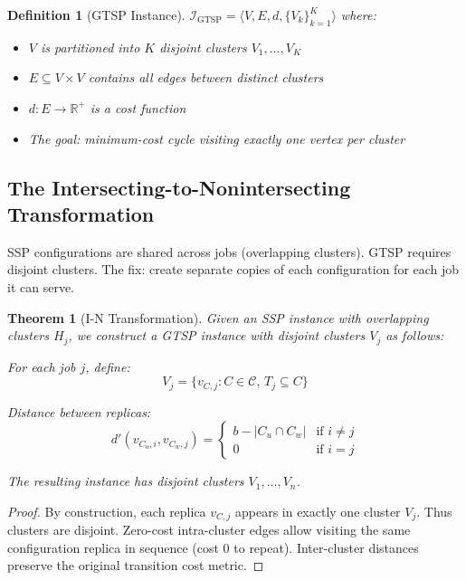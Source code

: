 \documentclass[12pt]{article}
\newtheorem{theorem}{Theorem}[section]
\newtheorem{definition}{Definition}[section]
\begin{document}
	\begin{definition}[GTSP Instance]
		$\mathcal{I}_{\text{GTSP}} = \langle V, E, d, \{V_k\}_{k=1}^{K} \rangle$ where:
		\begin{itemize}
			\item $V$ is partitioned into $K$ disjoint clusters $V_1, \ldots, V_K$
			\item $E \subseteq V \times V$ contains all edges between distinct clusters
			\item $d: E \to \mathbb{R}^+$ is a cost function
			\item The goal: minimum-cost cycle visiting exactly one vertex per cluster
		\end{itemize}
	\end{definition}
	
	\subsection{The Intersecting-to-Nonintersecting Transformation}
	
	\begin{intuitionbox}
		SSP configurations are shared across jobs (overlapping clusters). GTSP requires disjoint clusters. The fix: create separate copies of each configuration for each job it can serve.
	\end{intuitionbox}
	
	\begin{theorem}[I-N Transformation]
		\label{thm:in_transform}
		Given an SSP instance with overlapping clusters $H_j$, we construct a GTSP instance with disjoint clusters $V_j$ as follows:
		
		For each job $j$, define:
		$$V_j = \{ v_{C,j} : C \in \mathcal{C}, \, T_j \subseteq C \}$$
		
		Distance between replicas:
		$$d'(v_{C_u, i}, v_{C_w, j}) = \begin{cases}
			b - |C_u \cap C_w| & \text{if } i \neq j \\
			0 & \text{if } i = j
		\end{cases}$$
		
		The resulting instance has disjoint clusters $V_1, \ldots, V_n$.
	\end{theorem}
	\begin{proof}
		By construction, each replica $v_{C,j}$ appears in exactly one cluster $V_j$. Thus clusters are disjoint. Zero-cost intra-cluster edges allow visiting the same configuration replica in sequence (cost 0 to repeat). Inter-cluster distances preserve the original transition cost metric.
	\end{proof}
	
\end{document}
